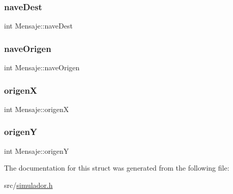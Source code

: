 \mbox{\label{structMensaje_a8f10066420dfb608ee23b6f0da6fd9e9}} 
\subsubsection{\texorpdfstring{nave\+Dest}{naveDest}}
{\footnotesize\ttfamily int Mensaje\+::nave\+Dest}

\mbox{\label{structMensaje_a33d63bdf8d56cb942bbb30b4da5c8e79}} 
\subsubsection{\texorpdfstring{nave\+Origen}{naveOrigen}}
{\footnotesize\ttfamily int Mensaje\+::nave\+Origen}

\mbox{\label{structMensaje_a57427586f1955551b892ebdfb4839e86}} 
\subsubsection{\texorpdfstring{origenX}{origenX}}
{\footnotesize\ttfamily int Mensaje\+::origenX}

\mbox{\label{structMensaje_ab890838ae5e84341319fad6c5d67c679}} 
\subsubsection{\texorpdfstring{origenY}{origenY}}
{\footnotesize\ttfamily int Mensaje\+::origenY}



The documentation for this struct was generated from the following file\+:\begin{DoxyCompactItemize}
\item 
src/\hyperlink{simulador_8h}{simulador.\+h}\end{DoxyCompactItemize}
